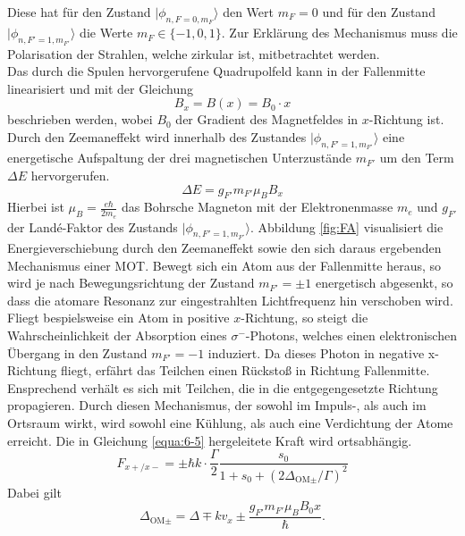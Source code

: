 \documentclass[
class=book,
accentcolor=1b,
custommargins=geometry,
fontsize=11pt,
thesis={type=Versuchsanleitung},
ruledheaders=all,
headline=false,
instbox=false,
marginpar=false,
title=small,
ignore-missing-data=true,
twoside=false,
logofile=apqdesign/tuda_logo.pdf,
pdfa=false %
]{apqpub}
\begin{document}
				Diese hat für den Zustand $\lvert \phi_{n,F=0,m_F}\rangle$ den Wert $m_F=0$ und für den Zustand $\lvert \phi_{n,F'=1,m_{F'}}\rangle$ die Werte $m_F \in \{-1,0,1\}$. 
				Zur Erklärung des Mechanismus muss die Polarisation der Strahlen, welche zirkular ist, mitbetrachtet werden.\\
				Das durch die Spulen hervorgerufene Quadrupolfeld kann in der Fallenmitte linearisiert und mit der Gleichung
				\begin{equation}
				B_x = B(x) = B_0 \cdot x
				\end{equation}			
				beschrieben werden, wobei $B_0$ der Gradient des Magnetfeldes in $x$-Richtung ist. 
				Durch den Zeemaneffekt wird innerhalb des Zustandes $\lvert \phi_{n,F'=1,m_{F'}}\rangle$ eine energetische Aufspaltung der drei magnetischen Unterzustände $m_{F'}$ um den Term $\varDelta E$ hervorgerufen.		
				\begin{equation}
				\varDelta E = g_{F'} m_{F'} \mu_B B_x
				\end{equation}				
				Hierbei ist $\mu_B = \frac{e \hbar}{2 m_e}$ das Bohrsche Magneton mit der Elektronenmasse $m_e$ und $g_{F'}$ der Landé-Faktor des Zustands $\lvert \phi_{n,F'=1,m_{F'}}\rangle$. 
				Abbildung \ref{fig:FA} visualisiert die Energieverschiebung durch den Zeemaneffekt sowie den sich daraus ergebenden Mechanismus einer MOT. 
				Bewegt sich ein Atom aus der Fallenmitte heraus, so wird je nach Bewegungsrichtung der Zustand $m_{F'} = \pm 1$ energetisch abgesenkt, so dass die atomare Resonanz zur eingestrahlten Lichtfrequenz hin verschoben wird. 
				Fliegt bespielsweise ein Atom in positive $x$-Richtung, so steigt die Wahrscheinlichkeit der Absorption eines $\sigma^-$-Photons, welches einen elektronischen Übergang in den Zustand $m_{F'} = -1$ induziert. 
				Da dieses Photon in negative x-Richtung fliegt, erfährt das Teilchen einen Rückstoß in Richtung	Fallenmitte. 
				Ensprechend verhält es sich mit Teilchen, die in die entgegengesetzte Richtung propagieren.
				Durch diesen Mechanismus, der sowohl im Impuls-, als auch im Ortsraum wirkt, wird sowohl eine Kühlung, als auch eine Verdichtung der Atome erreicht.
				Die in Gleichung \eqref{equa:6-5} hergeleitete Kraft wird ortsabhängig.			
				\begin{equation}\label{equa:6-11}
				F_{x+/ x-} = \pm \hbar k \cdot \frac{\varGamma}{2} \frac{s_0}{1+s_0+(2\varDelta_{\text{OM}\pm}/\varGamma)^2} 
				\end{equation}				
				Dabei gilt		
				\begin{equation}
				\varDelta_{\text{OM}\pm} = \varDelta \mp k v_{x} \pm \frac{g_{F'} m_{F'} \mu_B B_0 x}{\hbar}.
				\end{equation}				
\end{document}
